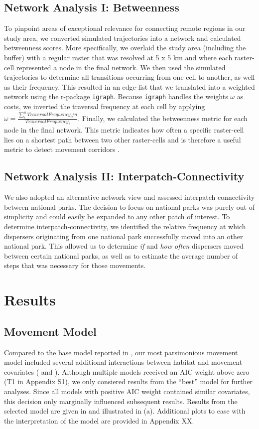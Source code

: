 \documentclass[abstract=on,10pt,a4paper,bibliography=totocnumbered]{article}
\begin{document}
\subsection{Network Analysis I: Betweenness}
To pinpoint areas of exceptional relevance for connecting remote regions in our
study area, we converted simulated trajectories into a network and calculated
betweenness scores. More specifically, we overlaid the study area (including the
buffer) with a regular raster that was resolved at 5 x 5 km and where each
raster-cell represented a node in the final network. We then used the simulated
trajectories to determine all transitions occurring from one cell to another, as
well as their frequency. This resulted in an edge-list that we translated into a
weighted network using the r-package {\tt igraph}. Because {\tt igraph} handles
the weights \(\omega\) as costs, we inverted the traversal frequency at each
cell by applying \(\omega = \frac{\sum_i^n{Traversal Frequency_i}/n}{Traversal
Frequency_i}\). Finally, we calculated the betweenness metric for each node in
the final network. This metric indicates how often a specific raster-cell lies
on a shortest path between two other raster-cells and is therefore a useful
metric to detect movement corridors \citep{BastilleRousseau.2018}.

\subsection{Network Analysis II: Interpatch-Connectivity}
We also adopted an alternative network view and assessed interpatch connectivity
between national parks. The decision to focus on national parks was purely out
of simplicity and could easily be expanded to any other patch of interest. To
determine interpatch-connectivity, we identified the relative frequency at which
dispersers originating from one national park successfully moved into an other
national park. This allowed us to determine \textit{if} and \textit{how often}
dispersers moved between certain national parks, as well as to estimate the
average number of steps that was necessary for those movements.

\section{Results}
\subsection{Movement Model}
Compared to the base model reported in \citep{Hofmann.2021}, our most
parsimonious movement model included several additional interactions between
habitat and movement covariates ( and
). Although multiple models received an AIC weight
above zero (T1 in Appendix S1), we only consiered results from the  ``best''
model for further analyses. Since all models with positive AIC weight contained
similar covariates, this decision only marginally influenced subsequent results.
Results from the selected model are given in  and
illustrated in  (a). Additional plots to ease with the
interpretation of the model are provided in Appendix XX.
\end{document}
